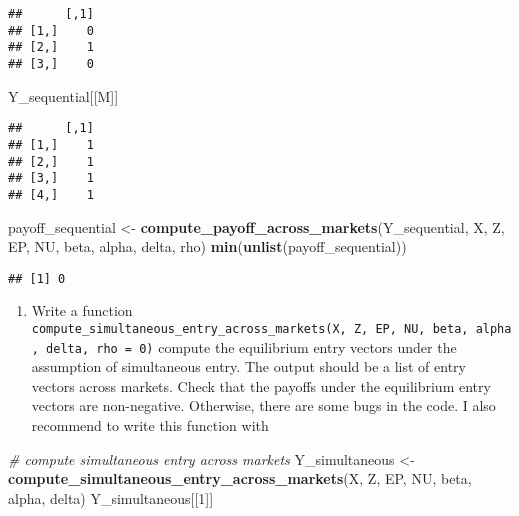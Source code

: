 \documentclass[
]{book}
\newenvironment{Shaded}{\begin{snugshade}}{\end{snugshade}}
\newcommand{\CommentTok}[1]{\textcolor[rgb]{0.56,0.35,0.01}{\textit{#1}}}
\newcommand{\DecValTok}[1]{\textcolor[rgb]{0.00,0.00,0.81}{#1}}
\newcommand{\KeywordTok}[1]{\textcolor[rgb]{0.13,0.29,0.53}{\textbf{#1}}}
\newcommand{\NormalTok}[1]{#1}
\newcommand{\StringTok}[1]{\textcolor[rgb]{0.31,0.60,0.02}{#1}}
\providecommand{\tightlist}{%
  \setlength{\itemsep}{0pt}\setlength{\parskip}{0pt}}
\begin{document}
\begin{verbatim}
##      [,1]
## [1,]    0
## [2,]    1
## [3,]    0
\end{verbatim}

\begin{Shaded}
\begin{Highlighting}[]
\NormalTok{Y_sequential[[M]]}
\end{Highlighting}
\end{Shaded}

\begin{verbatim}
##      [,1]
## [1,]    1
## [2,]    1
## [3,]    1
## [4,]    1
\end{verbatim}

\begin{Shaded}
\begin{Highlighting}[]
\NormalTok{payoff_sequential <-}
\StringTok{  }\KeywordTok{compute_payoff_across_markets}\NormalTok{(Y_sequential, X, Z, EP, NU, beta, alpha, delta, rho)}
\KeywordTok{min}\NormalTok{(}\KeywordTok{unlist}\NormalTok{(payoff_sequential))}
\end{Highlighting}
\end{Shaded}

\begin{verbatim}
## [1] 0
\end{verbatim}

\begin{enumerate}
\def\labelenumi{\arabic{enumi}.}
\setcounter{enumi}{7}
\tightlist
\item
  Write a function \texttt{compute\_simultaneous\_entry\_across\_markets(X,\ Z,\ EP,\ NU,\ beta,\ alpha,\ delta,\ rho\ =\ 0)} compute the equilibrium entry vectors under the assumption of simultaneous entry. The output should be a list of entry vectors across markets. Check that the payoffs under the equilibrium entry vectors are non-negative. Otherwise, there are some bugs in the code. I also recommend to write this function with
\end{enumerate}

\begin{Shaded}
\begin{Highlighting}[]
\CommentTok{# compute simultaneous entry across markets}
\NormalTok{Y_simultaneous <-}
\StringTok{  }\KeywordTok{compute_simultaneous_entry_across_markets}\NormalTok{(X, Z, EP, NU, beta, alpha, delta)}
\NormalTok{Y_simultaneous[[}\DecValTok{1}\NormalTok{]]}
\end{Highlighting}
\end{Shaded}
\end{document}
